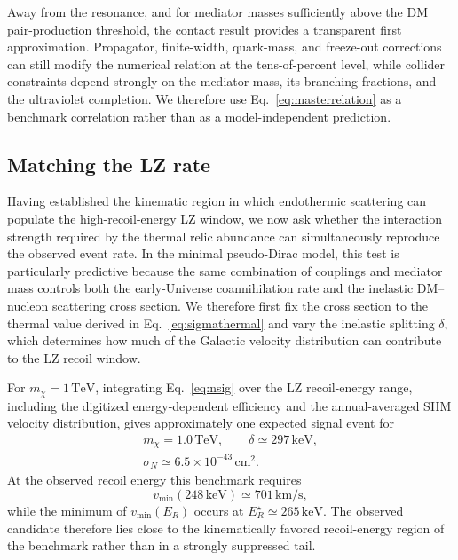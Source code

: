 \documentclass[aps,prd,reprint,superscriptaddress,nofootinbib,longbibliography,floatfix]{revtex4-2}
\newcommand{\TeV}{\mathrm{TeV}}
\newcommand{\keV}{\mathrm{keV}}
\begin{document}
Away from the resonance, and for mediator masses sufficiently above the DM pair-production threshold, the contact result provides a transparent first approximation. Propagator, finite-width, quark-mass, and freeze-out corrections can still modify the numerical relation at the tens-of-percent level, while collider constraints depend strongly on the mediator mass, its branching fractions, and the ultraviolet completion. We therefore use Eq.~\eqref{eq:masterrelation} as a benchmark correlation rather than as a model-independent prediction.




\subsection{Matching the LZ rate}

Having established the kinematic region in which endothermic scattering can populate the high-recoil-energy LZ window, we now ask whether the interaction strength required by the thermal relic abundance can simultaneously reproduce the observed event rate. In the minimal pseudo-Dirac model, this test is particularly predictive because the same combination of couplings and mediator mass controls both the early-Universe coannihilation rate and the inelastic DM--nucleon scattering cross section. We therefore first fix the cross section to the thermal value derived in Eq.~\eqref{eq:sigmathermal} and vary the inelastic splitting $\delta$, which determines how much of the Galactic velocity distribution can contribute to the LZ recoil window.

For $m_\chi=1\,\TeV$, integrating Eq.~\eqref{eq:nsig} over the LZ recoil-energy range, including the digitized energy-dependent efficiency and the annual-averaged SHM velocity distribution, gives approximately one expected signal event for
\begin{equation}
\begin{gathered}
m_\chi=1.0\,\TeV,\qquad \delta\simeq297\,\keV,\\
\sigma_N\simeq6.5\times10^{-43}\,\mathrm{cm}^2.
\end{gathered}
\label{eq:genericbenchmark}
\end{equation}
At the observed recoil energy this benchmark requires
\begin{equation}
v_{\min}(248\,\keV)\simeq701\,\mathrm{km/s},
\end{equation}
while the minimum of $v_{\min}(E_R)$ occurs at $E_R^\star\simeq265\,\keV$. The observed candidate therefore lies close to the kinematically favored recoil-energy region of the benchmark rather than in a strongly suppressed tail.
\end{document}
